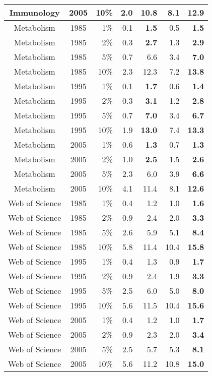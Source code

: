 \documentclass[11pt, oneside]{article}   	%
\begin{document}
\begin{table}
\begin{centering}
{\begin{tabular}{|c crrrr r|}
Immunology & 2005&10\%& 2.0& 10.8& 8.1& \bf{12.9} \\ 
\hline
Metabolism & 1985&1\%& 0.1& \bf{1.5}& 0.5& \bf{1.5} \\ 
Metabolism & 1985&2\%& 0.3& \bf{2.7}& 1.3& \bf{2.9} \\ 
Metabolism & 1985&5\%& 0.7& 6.6& 3.4& \bf{7.0} \\ 
Metabolism & 1985&10\%& 2.3& 12.3& 7.2& \bf{13.8} \\ 
Metabolism & 1995&1\%& 0.1& \bf{1.7}& 0.6& \bf{1.4} \\ 
Metabolism & 1995&2\%& 0.3& \bf{3.1}& 1.2& \bf{2.8} \\ 
Metabolism & 1995&5\%& 0.7& \bf{7.}0& 3.4& \bf{6.7} \\ 
Metabolism & 1995&10\%& 1.9& \bf{13.0}& 7.4& \bf{13.3} \\ 
Metabolism & 2005&1\%& 0.6& \bf{1.3}& 0.7& \bf{1.3} \\ 
Metabolism & 2005&2\%& 1.0& \bf{2.5}& 1.5& \bf{2.6} \\ 
Metabolism & 2005&5\%& 2.3& 6.0& 3.9& \bf{6.6} \\ 
Metabolism & 2005&10\%& 4.1& 11.4& 8.1& \bf{12.6} \\ 
\hline
Web of Science & 1985&1\%& 0.4& 1.2& 1.0& \bf{1.6} \\ 
Web of Science & 1985&2\%& 0.9& 2.4& 2.0& \bf{3.3} \\ 
Web of Science & 1985&5\%& 2.6& 5.9& 5.1& \bf{8.4} \\ 
Web of Science & 1985&10\%& 5.8& 11.4& 10.4& \bf{15.8} \\ 
Web of Science & 1995&1\%& 0.4& 1.3& 0.9& \bf{1.7} \\ 
Web of Science & 1995&2\%& 0.9& 2.4& 1.9& \bf{3.3} \\ 
Web of Science & 1995&5\%& 2.5& 6.0& 5.0& \bf{8.0} \\ 
Web of Science & 1995&10\%& 5.6& 11.5& 10.4& \bf{15.6} \\ 
Web of Science & 2005&1\%& 0.4& 1.2& 1.0& \bf{1.7} \\ 
Web of Science & 2005&2\%& 0.9& 2.3& 2.0& \bf{3.4} \\ 
Web of Science & 2005&5\%& 2.5& 5.7& 5.3& \bf{8.1} \\ 
Web of Science & 2005&10\%& 5.6& 11.2& 10.8& \bf{15.0} \\
\hline
\end{tabular}} 
\end{centering}
\end{table}
​
\end{document}
